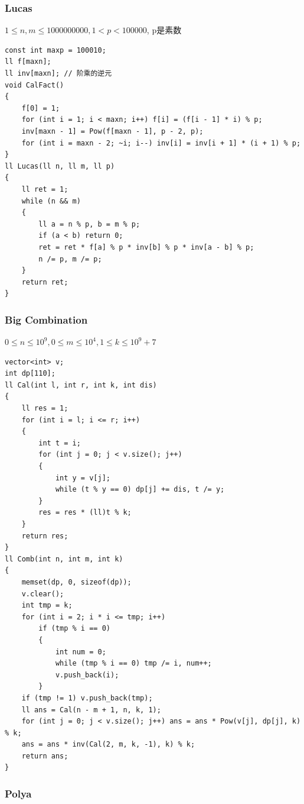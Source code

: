 \documentclass[twoside]{article}
\begin{document}
\subsubsection{Lucas}

$1 \leq n, m \leq 1000000000, 1 < p < 100000$, p是素数
\begin{lstlisting}
const int maxp = 100010;
ll f[maxn];
ll inv[maxn]; // 阶乘的逆元
void CalFact()
{
    f[0] = 1;
    for (int i = 1; i < maxn; i++) f[i] = (f[i - 1] * i) % p;
    inv[maxn - 1] = Pow(f[maxn - 1], p - 2, p);
    for (int i = maxn - 2; ~i; i--) inv[i] = inv[i + 1] * (i + 1) % p;
}
ll Lucas(ll n, ll m, ll p)
{
    ll ret = 1;
    while (n && m)
    {
        ll a = n % p, b = m % p;
        if (a < b) return 0;
        ret = ret * f[a] % p * inv[b] % p * inv[a - b] % p;
        n /= p, m /= p;
    }
    return ret;
}
\end{lstlisting}
\subsubsection{Big Combination}

$0 \leq n \leq 10^9, 0 \leq m \leq 10^4, 1 \leq k \leq 10^9+7$
\begin{lstlisting}
vector<int> v;
int dp[110];
ll Cal(int l, int r, int k, int dis)
{
    ll res = 1;
    for (int i = l; i <= r; i++)
    {
        int t = i;
        for (int j = 0; j < v.size(); j++)
        {
            int y = v[j];
            while (t % y == 0) dp[j] += dis, t /= y;
        }
        res = res * (ll)t % k;
    }
    return res;
}
ll Comb(int n, int m, int k)
{
    memset(dp, 0, sizeof(dp));
    v.clear();
    int tmp = k;
    for (int i = 2; i * i <= tmp; i++)
        if (tmp % i == 0)
        {
            int num = 0;
            while (tmp % i == 0) tmp /= i, num++;
            v.push_back(i);
        }
    if (tmp != 1) v.push_back(tmp);
    ll ans = Cal(n - m + 1, n, k, 1);
    for (int j = 0; j < v.size(); j++) ans = ans * Pow(v[j], dp[j], k) % k;
    ans = ans * inv(Cal(2, m, k, -1), k) % k;
    return ans;
}
\end{lstlisting}

\subsubsection{Polya}
\end{document}
